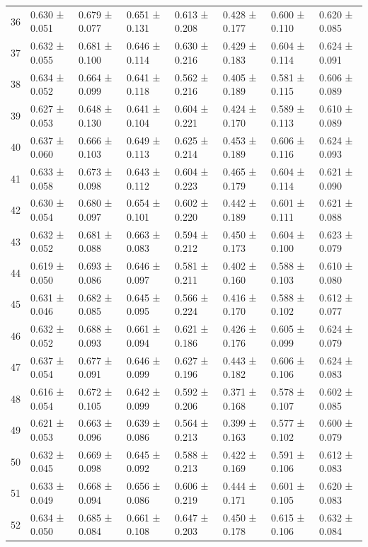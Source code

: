 \begin{tabular}{llllllll}
36 & 0.630 ± 0.051 & 0.679 ± 0.077 & 0.651 ± 0.131 & 0.613 ± 0.208 & 0.428 ± 0.177 & 0.600 ± 0.110 & 0.620 ± 0.085 \\
37 & 0.632 ± 0.055 & 0.681 ± 0.100 & 0.646 ± 0.114 & 0.630 ± 0.216 & 0.429 ± 0.183 & 0.604 ± 0.114 & 0.624 ± 0.091 \\
38 & 0.634 ± 0.052 & 0.664 ± 0.099 & 0.641 ± 0.118 & 0.562 ± 0.216 & 0.405 ± 0.189 & 0.581 ± 0.115 & 0.606 ± 0.089 \\
39 & 0.627 ± 0.053 & 0.648 ± 0.130 & 0.641 ± 0.104 & 0.604 ± 0.221 & 0.424 ± 0.170 & 0.589 ± 0.113 & 0.610 ± 0.089 \\
40 & 0.637 ± 0.060 & 0.666 ± 0.103 & 0.649 ± 0.113 & 0.625 ± 0.214 & 0.453 ± 0.189 & 0.606 ± 0.116 & 0.624 ± 0.093 \\
41 & 0.633 ± 0.058 & 0.673 ± 0.098 & 0.643 ± 0.112 & 0.604 ± 0.223 & 0.465 ± 0.179 & 0.604 ± 0.114 & 0.621 ± 0.090 \\
42 & 0.630 ± 0.054 & 0.680 ± 0.097 & 0.654 ± 0.101 & 0.602 ± 0.220 & 0.442 ± 0.189 & 0.601 ± 0.111 & 0.621 ± 0.088 \\
43 & 0.632 ± 0.052 & 0.681 ± 0.088 & 0.663 ± 0.083 & 0.594 ± 0.212 & 0.450 ± 0.173 & 0.604 ± 0.100 & 0.623 ± 0.079 \\
44 & 0.619 ± 0.050 & 0.693 ± 0.086 & 0.646 ± 0.097 & 0.581 ± 0.211 & 0.402 ± 0.160 & 0.588 ± 0.103 & 0.610 ± 0.080 \\
45 & 0.631 ± 0.046 & 0.682 ± 0.085 & 0.645 ± 0.095 & 0.566 ± 0.224 & 0.416 ± 0.170 & 0.588 ± 0.102 & 0.612 ± 0.077 \\
46 & 0.632 ± 0.052 & 0.688 ± 0.093 & 0.661 ± 0.094 & 0.621 ± 0.186 & 0.426 ± 0.176 & 0.605 ± 0.099 & 0.624 ± 0.079 \\
47 & 0.637 ± 0.054 & 0.677 ± 0.091 & 0.646 ± 0.099 & 0.627 ± 0.196 & 0.443 ± 0.182 & 0.606 ± 0.106 & 0.624 ± 0.083 \\
48 & 0.616 ± 0.054 & 0.672 ± 0.105 & 0.642 ± 0.099 & 0.592 ± 0.206 & 0.371 ± 0.168 & 0.578 ± 0.107 & 0.602 ± 0.085 \\
49 & 0.621 ± 0.053 & 0.663 ± 0.096 & 0.639 ± 0.086 & 0.564 ± 0.213 & 0.399 ± 0.163 & 0.577 ± 0.102 & 0.600 ± 0.079 \\
50 & 0.632 ± 0.045 & 0.669 ± 0.098 & 0.645 ± 0.092 & 0.588 ± 0.213 & 0.422 ± 0.169 & 0.591 ± 0.106 & 0.612 ± 0.083 \\
51 & 0.633 ± 0.049 & 0.668 ± 0.094 & 0.656 ± 0.086 & 0.606 ± 0.219 & 0.444 ± 0.171 & 0.601 ± 0.105 & 0.620 ± 0.083 \\
52 & 0.634 ± 0.050 & 0.685 ± 0.084 & 0.661 ± 0.108 & 0.647 ± 0.203 & 0.450 ± 0.178 & 0.615 ± 0.106 & 0.632 ± 0.084 \\

\end{tabular}
